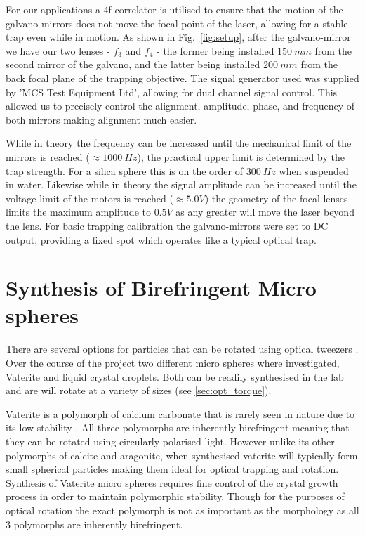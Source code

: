 For our applications a 4f correlator is utilised to ensure that the 
motion of the galvano-mirrors does not move the focal point of the 
laser, allowing for a stable trap even while in motion. As shown in Fig.~\ref{fig:setup}, after the galvano-mirror we have our two lenses 
- $f_3$ and $f_4$ - the former being installed $150\ mm$ from the 
second mirror of the galvano, and the latter being installed $200\ mm$ 
from the back focal plane of the trapping objective. The signal 
generator used was supplied by 'MCS Test Equipment Ltd', allowing for 
dual channel signal control. This allowed us to precisely control the
alignment, amplitude, phase, and frequency of both mirrors making 
alignment much easier. 

While in theory the frequency can be increased until the mechanical 
limit of the mirrors is reached ($\approx 1000\ Hz$), the practical 
upper limit is determined by the trap strength. For a silica sphere 
this is on the order of $300\ Hz$ when suspended in water. Likewise 
while in theory the signal amplitude can be increased until the 
voltage limit of the motors is reached ($\approx 5.0 V$) the geometry 
of the focal lenses limits the maximum amplitude to $0.5 V$ as any 
greater will move the laser beyond the lens. For basic trapping 
calibration the galvano-mirrors were set to DC output, providing a 
fixed spot which operates like a typical optical trap.

\section{Synthesis of Birefringent Micro spheres}
\label{sec:vaterite}
There are several options for particles that can be rotated 
using optical tweezers \cite{Parkin2009, Saito2022}. Over 
the course of the project two different micro spheres where 
investigated, Vaterite and liquid crystal droplets. Both can 
be readily synthesised in the lab and are will rotate at a 
variety of sizes (see \ref{sec:opt_torque}).

Vaterite is a polymorph of calcium carbonate that is rarely 
seen in nature due to its low stability \cite{KonopackaLyskawa2019}. 
All three polymorphs are inherently birefringent meaning 
that they can be rotated using circularly polarised light. 
However unlike its other polymorphs of calcite and aragonite, 
when synthesised vaterite will typically form small spherical 
particles making them ideal for optical trapping and rotation. 
Synthesis of Vaterite micro spheres requires fine control of 
the crystal growth process in order to maintain polymorphic 
stability. Though for the purposes of optical rotation the 
exact polymorph is not as important as the morphology as all 
3 polymorphs are inherently birefringent. 

